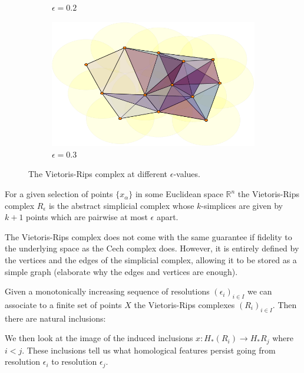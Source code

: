 \begin{figure}
\begin{subfigure}[b]{.49\linewidth}
    \caption{$\epsilon=0.2$}
 \end{subfigure}
  \begin{subfigure}[b]{.5\linewidth}
    \includegraphics[scale=.5]{rips_eps=03.pdf}
    \caption{$\epsilon=0.3$}
 \end{subfigure}
 \caption{The Vietoris-Rips complex at different $\epsilon$-values.}
 \label{manyrips}
\end{figure}
\begin{definition}
For a given selection of points $\{x_{\alpha}\}$ in some Euclidean space $\mathbb{R}^{n}$ the Vietoris-Rips complex $R_{\epsilon}$ is the abstract simplicial complex whose $k$-simplices are given by $k+1$ points which are pairwise at most $\epsilon$ apart.
\end{definition}

The Vietoris-Rips complex does not come with the same guarantee if fidelity to the underlying space as the Cech complex does. However, it is entirely defined by the vertices and the edges of the simplicial complex, allowing it to be stored as a simple graph (elaborate why the edges and vertices are enough).

Given a monotonically increasing sequence of resolutions $(\epsilon_{i})_{i \in I}$ we can associate to a finite set of points $X$ the Vietoris-Rips complexes $(R_i)_{{i \in I}}$. Then there are natural inclusions:
\begin{center}
\end{center}
We then look at the image of the induced inclusions $x: H_{*}(R_{i}) \to H_{*}R_{j}$ where $i < j$. These inclusions tell us what homological features persist going from resolution $\epsilon_{i}$ to resolution $\epsilon_{j}$.

